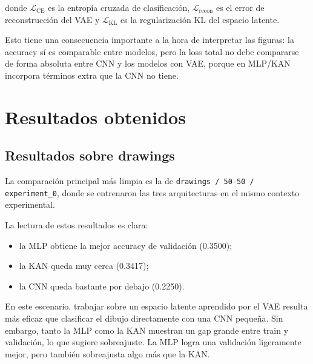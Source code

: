 \documentclass[11pt,a4paper]{report}
\begin{document}
donde $\mathcal{L}_{\text{CE}}$ es la entrop\'ia cruzada de clasificaci\'on, $\mathcal{L}_{\text{recon}}$ es el error de reconstrucci\'on del VAE y $\mathcal{L}_{\text{KL}}$ es la regularizaci\'on KL del espacio latente.

Esto tiene una consecuencia importante a la hora de interpretar las figuras: la accuracy s\'i es comparable entre modelos, pero la loss total no debe compararse de forma absoluta entre CNN y los modelos con VAE, porque en MLP/KAN incorpora t\'erminos extra que la CNN no tiene.

\section{Resultados obtenidos}

\subsection{Resultados sobre drawings}

La comparaci\'on principal m\'as limpia es la de \texttt{drawings / 50-50 / experiment\_0}, donde se entrenaron las tres arquitecturas en el mismo contexto experimental.

\begin{table}[H]
\centering
\caption{Mejor resultado de validaci\'on sobre \texttt{drawings / 50-50 / experiment\_0}.}
\end{table}

La lectura de estos resultados es clara:

\begin{itemize}
    \item la MLP obtiene la mejor accuracy de validaci\'on (0.3500);
    \item la KAN queda muy cerca (0.3417);
    \item la CNN queda bastante por debajo (0.2250).
\end{itemize}

En este escenario, trabajar sobre un espacio latente aprendido por el VAE resulta m\'as eficaz que clasificar el dibujo directamente con una CNN peque\~na. Sin embargo, tanto la MLP como la KAN muestran un gap grande entre train y validaci\'on, lo que sugiere sobreajuste. La MLP logra una validaci\'on ligeramente mejor, pero tambi\'en sobreajusta algo m\'as que la KAN.
\end{document}
